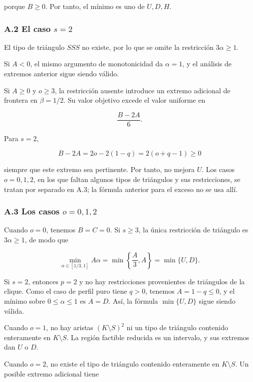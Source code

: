 \documentclass[
  spanish,
  11pt,
  a4paper,
]{article}
\begin{document}
porque \(B\ge0\). Por tanto, el mínimo es uno de \(U,D,H\).

\subsubsection{\texorpdfstring{A.2 El caso \(s=2\)}{A.2 El caso s=2}}\label{a.2-el-caso-s2}

El tipo de triángulo \(SSS\) no existe, por lo que se omite la restricción \(3\alpha\ge1\).

Si \(A<0\), el mismo argumento de monotonicidad da \(\alpha=1\), y el análisis de extremos anterior sigue siendo válido.

Si \(A\ge0\) y \(o\ge3\), la restricción ausente introduce un extremo adicional de frontera en \(\beta=1/2\). Su valor objetivo excede el valor uniforme en

\[
\frac{B-2A}{6}.
\]

Para \(s=2\),

\[
B-2A
=
2o-2(1-q)
=
2(o+q-1)\ge0
\]

siempre que este extremo sea pertinente. Por tanto, no mejora \(U\). Los casos \(o=0,1,2\), en los que faltan algunos tipos de triángulos y sus restricciones, se tratan por separado en A.3; la fórmula anterior para el exceso no se usa allí.

\subsubsection{\texorpdfstring{A.3 Los casos \(o=0,1,2\)}{A.3 Los casos o=0,1,2}}\label{a.3-los-casos-o012}

Cuando \(o=0\), tenemos \(B=C=0\). Si \(s\ge3\), la única restricción de triángulo es \(3\alpha\ge1\), de modo que

\[
\min_{\alpha\in[1/3,1]}A\alpha
=
\min\left\{\frac A3,A\right\}
=
\min\{U,D\}.
\]

Si \(s=2\), entonces \(p=2\) y no hay restricciones provenientes de triángulos de la clique. Como el caso de perfil puro tiene \(q>0\), tenemos \(A=1-q\le0\), y el mínimo sobre \(0\le\alpha\le1\) es \(A=D\). Así, la fórmula \(\min\{U,D\}\) sigue siendo válida.

Cuando \(o=1\), no hay aristas \((K\setminus S)^2\) ni un tipo de triángulo contenido enteramente en \(K\setminus S\). La región factible reducida es un intervalo, y sus extremos dan \(U\) o \(D\).

Cuando \(o=2\), no existe el tipo de triángulo contenido enteramente en \(K\setminus S\). Un posible extremo adicional tiene
\end{document}
